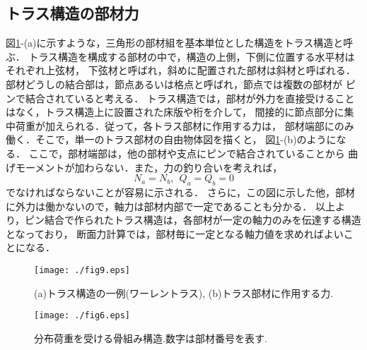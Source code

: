 \documentclass[10pt,a4j]{jarticle}
\begin{document}
\subsection{トラス構造の部材力}
図\ref{fig:fig12_9}-(a)に示すような，三角形の部材組を基本単位とした構造をトラス構造と呼ぶ．
トラス構造を構成する部材の中で，構造の上側，下側に位置する水平材はそれぞれ上弦材，
下弦材と呼ばれ，斜めに配置された部材は斜材と呼ばれる．
部材どうしの結合部は，節点あるいは格点と呼ばれ，節点では複数の部材が
ピンで結合されていると考える．
トラス構造では，部材が外力を直接受けることはなく，トラス構造上に設置された床版や桁を介して，
間接的に節点部分に集中荷重が加えられる．従って，各トラス部材に作用する力は，
部材端部にのみ働く．そこで，単一のトラス部材の自由物体図を描くと，
図\ref{fig:fig12_9}-(b)のようになる．
ここで，部材端部は，他の部材や支点にピンで結合されていることから
曲げモーメントが加わらない．また，力の釣り合いを考えれば，
\begin{equation}
	N_a=N_b, \ \ Q_a=Q_b=0
\end{equation}
でなければならないことが容易に示される．
さらに，この図に示した他，部材に外力は働かないので，軸力は部材内部で一定であることも分かる．
以上より，ピン結合で作られたトラス構造は，各部材が一定の軸力のみを伝達する構造となっており，
断面力計算では，部材毎に一定となる軸力値を求めればよいことになる．
\begin{figure}[h]
	\begin{center}
	\texttt{[image: ./fig9.eps]} 
	\end{center}
	\caption{
		(a)トラス構造の一例(ワーレントラス), (b)トラス部材に作用する力. 
	} 
	\label{fig:fig12_9}
\end{figure}
\begin{figure}[h]
	\begin{center}
	\texttt{[image: ./fig6.eps]} 
	\end{center}
	\caption{
		分布荷重を受ける骨組み構造.数字は部材番号を表す.
	} 
	\label{fig:fig12_6}
\end{figure}
\end{document}
